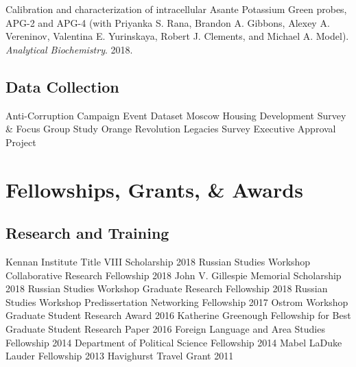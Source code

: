 \documentclass[11pt,]{article}
\begin{document}
Calibration and characterization of intracellular Asante Potassium Green
probes, APG-2 and APG-4 (with Priyanka S. Rana, Brandon A. Gibbons,
Alexey A. Vereninov, Valentina E. Yurinskaya, Robert J. Clements, and
Michael A. Model). \emph{Analytical Biochemistry}. 2018.

\hypertarget{data-collection}{%
\subsection{Data Collection}\label{data-collection}}

Anti-Corruption Campaign Event Dataset \newline Moscow Housing
Development Survey \& Focus Group Study \newline Orange Revolution
Legacies Survey \newline Executive Approval Project

\hypertarget{fellowships-grants-awards}{%
\section{Fellowships, Grants, \&
Awards}\label{fellowships-grants-awards}}

\hypertarget{research-and-training}{%
\subsection{Research and Training}\label{research-and-training}}

Kennan Institute Title VIII Scholarship \hfill 2018 \newline Russian
Studies Workshop Collaborative Research Fellowship \hfill 2018 \newline
John V. Gillespie Memorial Scholarship \hfill 2018 \newline Russian
Studies Workshop Graduate Research Fellowship \hfill 2018 \newline
Russian Studies Workshop Predissertation Networking Fellowship
\hfill 2017 \newline Ostrom Workshop Graduate Student Research Award
\hfill 2016 \newline Katherine Greenough Fellowship for Best Graduate
Student Research Paper \hfill 2016 \newline Foreign Language and Area
Studies Fellowship \hfill 2014 \newline Department of Political Science
Fellowship \hfill 2014 \newline Mabel LaDuke Lauder Fellowship
\hfill 2013 \newline Havighurst Travel Grant \hfill 2011
\end{document}
